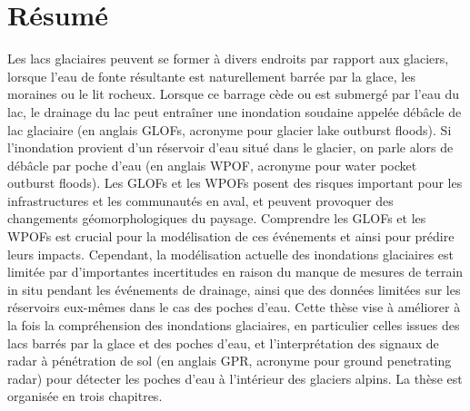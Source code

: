 \endgroup

\clearpage

\begingroup
\let\clearpage\relax
\let\cleardoublepage\relax
\let\cleardoublepage\relax

\chapter*{Résumé}

Les lacs glaciaires peuvent se former à divers endroits par rapport aux glaciers, lorsque l'eau de fonte résultante est naturellement barrée par la glace, les moraines ou le lit rocheux. Lorsque ce barrage cède ou est submergé par l'eau du lac, le drainage du lac peut entraîner une inondation soudaine appelée débâcle de lac glaciaire (en anglais GLOFs, acronyme pour glacier lake outburst floods). Si l'inondation provient d'un réservoir d'eau situé dans le glacier, on parle alors de débâcle par poche d'eau (en anglais WPOF, acronyme pour water pocket outburst floods). Les GLOFs et les WPOFs posent des risques important pour les infrastructures et les communautés en aval, et peuvent provoquer des changements géomorphologiques du paysage. Comprendre les GLOFs et les WPOFs est crucial pour la modélisation de ces événements et ainsi pour prédire leurs impacts. Cependant, la modélisation actuelle des inondations glaciaires est limitée par d'importantes incertitudes en raison du manque de mesures de terrain in situ pendant les événements de drainage, ainsi que des données limitées sur les réservoirs eux-mêmes dans le cas des poches d'eau. Cette thèse vise à améliorer à la fois la compréhension des inondations glaciaires, en particulier celles issues des lacs barrés par la glace et des poches d'eau, et l'interprétation des signaux de radar à pénétration de sol (en anglais GPR, acronyme pour ground penetrating radar) pour détecter les poches d'eau à l'intérieur des glaciers alpins. La thèse est organisée en trois chapitres.
%

